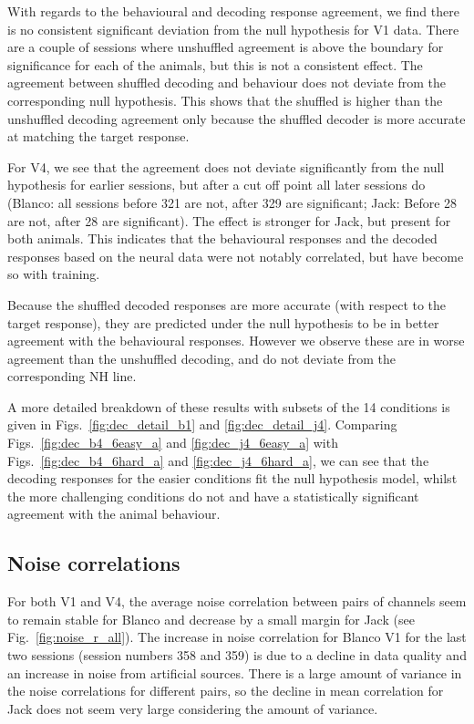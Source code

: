 With regards to the behavioural and decoding response agreement, we find there is no consistent significant deviation from the null hypothesis for \ac{V1} data. There are a couple of sessions where unshuffled agreement is above the boundary for significance for each of the animals, but this is not a consistent effect. The agreement between shuffled decoding and behaviour does not deviate from the corresponding null hypothesis. This shows that the shuffled is higher than the unshuffled decoding agreement only because the shuffled decoder is more accurate at matching the target response.

For \ac{V4}, we see that the agreement does not deviate significantly from the null hypothesis for earlier sessions, but after a cut off point all later sessions do (Blanco: all sessions before 321 are not, after 329 are significant; Jack: Before 28 are not, after 28 are significant). The effect is stronger for Jack, but present for both animals.
This indicates that the behavioural responses and the decoded responses based on the neural data were not notably correlated, but have become so with training.

Because the shuffled decoded responses are more accurate (with respect to the target response), they are predicted under the null hypothesis to be in better agreement with the behavioural responses. However we observe these are in worse agreement than the unshuffled decoding, and do not deviate from the corresponding NH line.

A more detailed breakdown of these results with subsets of the 14 conditions is given in Figs.~\ref{fig:dec_detail_b1} and \ref{fig:dec_detail_j4}.
Comparing Figs.~\ref{fig:dec_b4_6easy_a} and \ref{fig:dec_j4_6easy_a} with Figs.~\ref{fig:dec_b4_6hard_a} and \ref{fig:dec_j4_6hard_a}, we can see that the decoding responses for the easier conditions fit the null hypothesis model, whilst the more challenging conditions do not and have a statistically significant agreement with the animal behaviour.




\clearpage
\subsection{Noise correlations}

For both \ac{V1} and \ac{V4}, the average noise correlation between pairs of channels seem to remain stable for Blanco and decrease by a small margin for Jack (see Fig.~\ref{fig:noise_r_all}). The increase in noise correlation for Blanco \ac{V1} for the last two sessions (session numbers 358 and 359) is due to a decline in data quality and an increase in noise from artificial sources. There is a large amount of variance in the noise correlations for different pairs, so the decline in mean correlation for Jack does not seem very large considering the amount of variance.


